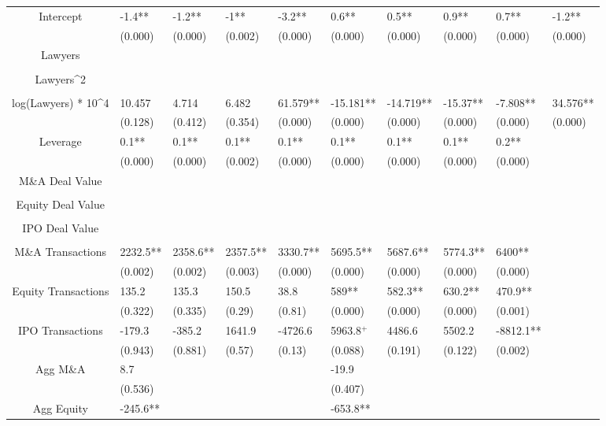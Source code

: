 \documentclass{article}
\begin{document}
\begin{table}[H]
\begin{tabular}{|clllllllll|}
Intercept & -1.4** & -1.2** & -1** & -3.2** & 0.6** & 0.5** & 0.9** & 0.7** & -1.2** \\
   & (0.000) & (0.000) & (0.002) & (0.000) & (0.000) & (0.000) & (0.000) & (0.000) & (0.000) \\
  Lawyers &  &  &  &  &  &  &  &  &  \\
   &  &  &  &  &  &  &  &  &  \\
  Lawyers^2 &  &  &  &  &  &  &  &  &  \\
   &  &  &  &  &  &  &  &  &  \\
  log(Lawyers) * 10^4 & 10.457 & 4.714 & 6.482 & 61.579** & -15.181** & -14.719** & -15.37** & -7.808** & 34.576** \\
   & (0.128) & (0.412) & (0.354) & (0.000) & (0.000) & (0.000) & (0.000) & (0.000) & (0.000) \\
  Leverage & 0.1** & 0.1** & 0.1** & 0.1** & 0.1** & 0.1** & 0.1** & 0.2** &  \\
   & (0.000) & (0.000) & (0.002) & (0.000) & (0.000) & (0.000) & (0.000) & (0.000) &  \\
  M\&A Deal Value &  &  &  &  &  &  &  &  &  \\
   &  &  &  &  &  &  &  &  &  \\
  Equity Deal Value &  &  &  &  &  &  &  &  &  \\
   &  &  &  &  &  &  &  &  &  \\
  IPO Deal Value &  &  &  &  &  &  &  &  &  \\
   &  &  &  &  &  &  &  &  &  \\
  M\&A Transactions & 2232.5** & 2358.6** & 2357.5** & 3330.7** & 5695.5** & 5687.6** & 5774.3** & 6400** &  \\
   & (0.002) & (0.002) & (0.003) & (0.000) & (0.000) & (0.000) & (0.000) & (0.000) &  \\
  Equity Transactions & 135.2 & 135.3 & 150.5 & 38.8 & 589** & 582.3** & 630.2** & 470.9** &  \\
   & (0.322) & (0.335) & (0.29) & (0.81) & (0.000) & (0.000) & (0.000) & (0.001) &  \\
  IPO Transactions & -179.3 & -385.2 & 1641.9 & -4726.6 & 5963.8$^{+}$ & 4486.6 & 5502.2 & -8812.1** &  \\
   & (0.943) & (0.881) & (0.57) & (0.13) & (0.088) & (0.191) & (0.122) & (0.002) &  \\
  Agg M\&A & 8.7 &  &  &  & -19.9 &  &  &  &  \\
   & (0.536) &  &  &  & (0.407) &  &  &  &  \\
  Agg Equity & -245.6** &  &  &  & -653.8** &  &  &  &  \\

\end{tabular}
\end{table}
\end{document}
